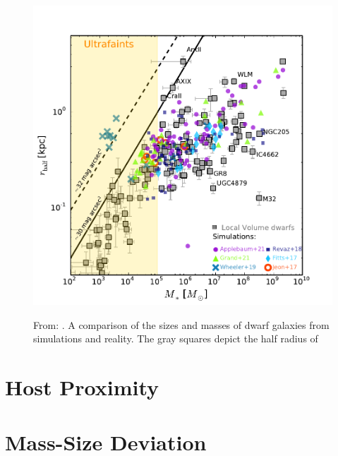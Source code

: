 \begin{figure}
    \includegraphics*[width=\textwidth]{figs/sales/fig4.pdf}
    \label{fig:sales-size-mass}
    \caption{
        From: \cite{salesBaryonicSolutionsChallenges2022}. A comparison of the sizes and masses of dwarf galaxies from simulations and reality. The gray squares depict the half radius of 
    }
\end{figure}


\section{Host Proximity}

\section{Mass-Size Deviation}
